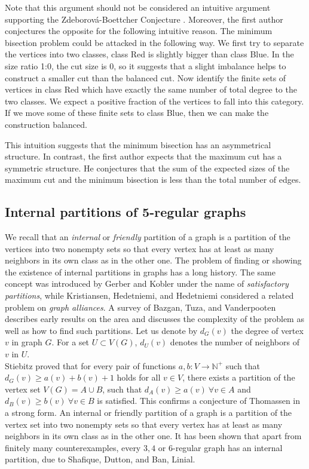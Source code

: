 \documentclass{article}
\theoremstyle{definition}
\begin{document}
\medskip
Note that this argument should not be considered an intuitive argument supporting the
Zdeborov\'a-Boettcher Conjecture \cite{zdeborova2010conjecture}.
Moreover, the first author conjectures the opposite for the following intuitive reason.
The minimum bisection problem could be attacked in the following way.
We first try to separate the vertices into two classes, class Red is slightly bigger than class Blue.
In the size ratio 1:0, the cut size is 0, so it suggests that a slight imbalance helps to construct a smaller cut than the balanced cut.
Now identify the finite sets of vertices in class Red which have exactly the same number of total degree to the two classes.
We expect a positive fraction of the vertices to fall into this category.
If we move some of these finite sets to class Blue, then we can make the construction balanced.

This intuition suggests that the minimum bisection has an asymmetrical structure.
In contrast, the first author expects that the maximum cut has a symmetric structure. 
He conjectures that the sum of the expected sizes of the maximum cut and the minimum bisection is less than the total number of edges.

\subsection{Internal partitions of 5-regular graphs}
We recall that an {\em internal} or {\em friendly} partition of a graph is a partition of the vertices into two nonempty sets so that every vertex has at least as many neighbors in its own class as in the other one. The problem of finding or showing the existence of internal partitions in graphs has a long history. The same concept was introduced by Gerber and Kobler \cite{gerber2004classes} under the name of {\em satisfactory partitions}, while Kristiansen, Hedetniemi, and Hedetniemi \cite{kristiansen2002introduction} considered a related problem on {\em graph alliances}. A survey of Bazgan, Tuza, and Vanderpooten \cite{bazgan2010satisfactory} describes early results on the area and discusses the complexity of the problem as well as how to find such partitions. Let us denote by $d_G(v)$ the degree of vertex $v$ in graph $G$. For a set $U\subset V(G)$, $d_U(v)$ denotes the number of neighbors of $v$ in $U$.\\
Stiebitz \cite{stiebitz1996decomposing} proved that for every pair of functions
$a, b : V \rightarrow \mathbb{N}^+$ such that $ d_G(v) \geq a(v) +b(v) + 1 $ holds for all $v\in V$, there exists a partition of the vertex set 
$V(G) = A\cup B$, such that  $d_A(v) \geq  a(v) \  \forall v \in A$ and  $d_B(v) \geq b(v) \ \forall v \in B$ is satisfied.
This confirms a conjecture of Thomassen \cite{thomassen1983graph} in a strong form. 
An internal or friendly partition of a graph is a partition of the vertex set into two nonempty sets so that every vertex has at least as many neighbors in its own class as in the other one. It has been shown that apart from finitely many counterexamples, every \(3, 4\) or \(6\)-regular graph has an internal partition, due to Shafique, Dutton, and Ban, Linial. 
\end{document}
